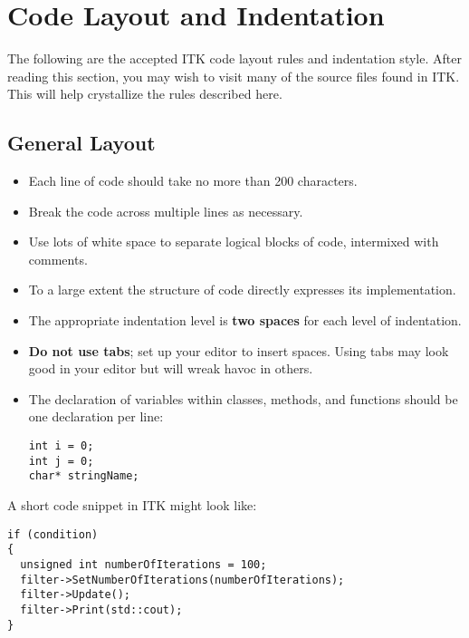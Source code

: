 \section{Code Layout and Indentation}
\label{sec:CodeLayoutAndIndentation}

The following are the accepted ITK code layout rules and indentation style.
After reading this section, you may wish to visit many of the source files found
in ITK. This will help crystallize the rules described here.


\subsection{General Layout}
\label{subsec:GeneralLayout}

\begin{itemize}
\item Each line of code should take no more than 200 characters.
\item Break the code across multiple lines as necessary.
\item Use lots of white space to separate logical blocks of code, intermixed
with comments.
\item To a large extent the structure of code directly expresses its
implementation.
\item The appropriate indentation level is \textbf{two spaces} for each level of
indentation.
\item \textbf{Do not use tabs}; set up your editor to insert spaces. Using tabs
may look good in your editor but will wreak havoc in others.
\item The declaration of variables within classes, methods, and functions should
be one declaration per line:

\small
\begin{verbatim}
int i = 0;
int j = 0;
char* stringName;
\end{verbatim}
\normalsize
\end{itemize}

A short code snippet in ITK might look like:

\small
\begin{verbatim}
if (condition)
{
  unsigned int numberOfIterations = 100;
  filter->SetNumberOfIterations(numberOfIterations);
  filter->Update();
  filter->Print(std::cout);
}
\end{verbatim}
\normalsize

